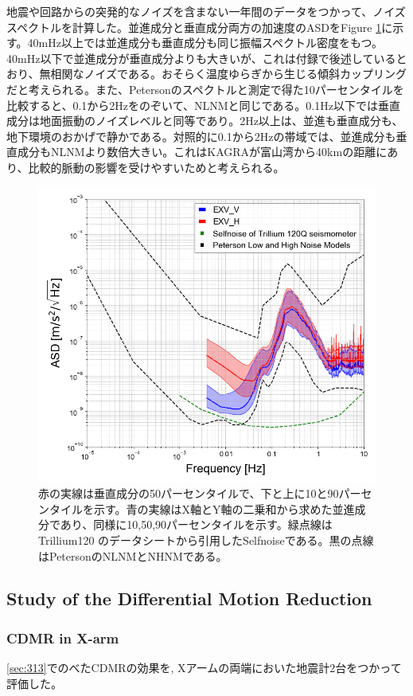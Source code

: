 地震や回路からの突発的なノイズを含まない一年間のデータをつかって、ノイズスペクトルを計算した。並進成分と垂直成分両方の加速度のASDをFigure \ref{img:img313}に示す。40mHz以上では並進成分も垂直成分も同じ振幅スペクトル密度をもつ。40mHz以下で並進成分が垂直成分よりも大きいが、これは付録で後述しているとおり、無相関なノイズである。おそらく温度ゆらぎから生じる傾斜カップリングだと考えられる。また、Petersonのスペクトルと測定で得た10パーセンタイルを比較すると、0.1から2Hzをのぞいて、NLNMと同じである。0.1Hz以下では垂直成分は地面振動のノイズレベルと同等であり。2Hz以上は、並進も垂直成分も、地下環境のおかげで静かである。対照的に0.1から2Hzの帯域では、並進成分も垂直成分もNLNMより数倍大きい。これはKAGRAが富山湾から40kmの距離にあり、比較的脈動の影響を受けやすいためと考えられる。
\begin{figure}[p]
  \includegraphics[width=13.0cm]{./img_chap3/img313.png}
  \caption{赤の実線は垂直成分の50パーセンタイルで、下と上に10と90パーセンタイルを示す。青の実線はX軸とY軸の二乗和から求めた並進成分であり、同様に10,50,90パーセンタイルを示す。緑点線はTrillium120 のデータシートから引用したSelfnoiseである。黒の点線はPetersonのNLNMとNHNMである。}\label{img:img313}
\end{figure}

\subsection{Study of the Differential Motion Reduction} \label{sec:332}

\subsubsection{CDMR in X-arm }
\cref{sec:313}でのべたCDMRの効果を, Xアームの両端においた地震計2台をつかって評価した。


